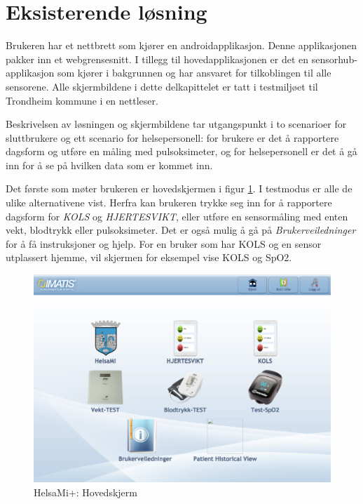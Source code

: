 \section{Eksisterende løsning}
Brukeren har et nettbrett som kjører en androidapplikasjon. Denne applikasjonen pakker inn
et webgrensesnitt. I tillegg til hovedapplikasjonen er det en sensorhub-applikasjon som kjører i bakgrunnen
og har ansvaret for tilkoblingen til alle sensorene. Alle skjermbildene i dette delkapittelet er tatt i testmiljøet
til Trondheim kommune i en nettleser.

Beskrivelsen av løsningen og skjermbildene tar utgangspunkt i to scenarioer for sluttbrukere
og ett scenario for helsepersonell: for brukere er det å rapportere dagsform og utføre en måling med pulsoksimeter,
og for helsepersonell er det å gå inn for å se på hvilken data som er kommet inn.

Det første som møter brukeren er hovedskjermen i figur \ref{fig:helsami_hovedskjerm}. I testmodus er alle de ulike
alternativene vist.
Herfra kan brukeren trykke seg inn for å rapportere dagsform for \textit{KOLS} og \textit{HJERTESVIKT}, eller utføre en sensormåling med
enten vekt, blodtrykk eller pulsoksimeter. Det er også mulig å gå på \textit{Brukerveiledninger} for å få instruksjoner og hjelp.
For en bruker som har KOLS og en sensor utplassert hjemme, vil skjermen for eksempel vise KOLS og SpO2.

\begin{figure}
\includegraphics[width=1.0\textwidth,center]{fig/helsami/hovedskjerm}
\caption{HelsaMi+: Hovedskjerm}
\label{fig:helsami_hovedskjerm}
\end{figure}


